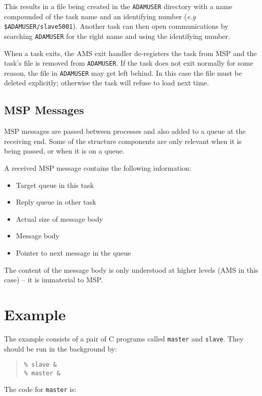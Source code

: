 \documentclass[twoside,11pt]{article}
\renewcommand{\_}{\texttt{\symbol{95}}}
\begin{document}
This results in a file being created in the \texttt{ADAM\_USER} directory
with a name compounded of the task name and an identifying number
(\textit{e.g} \texttt{\$ADAM\_USER/slave\_5001}).
Another task can then open communications by searching \texttt{ADAM\_USER} for
the right name and using the identifying number.

When a task exits, the AMS exit handler de-registers the task from MSP and
the task's file is removed from \texttt{ADAM\_USER}.
If the task does not exit normally for some reason, the file in
\texttt{ADAM\_USER} may get left behind.
In this case the file must be deleted explicitly; otherwise the
task will refuse to load next time.

\subsection{MSP Messages}
MSP messages are passed between processes and also added to a queue at the
receiving end. Some of the structure components are only relevant when it is
being passed, or when it is on a queue.

A received MSP message contains the following information:
\begin{itemize}
\item Target queue in this task
\item Reply queue in other task
\item Actual size of message body
\item Message body
\item Pointer to next message in the queue
\end{itemize}
The content of the message body is only understood at higher levels (AMS in
this case) -- it is immaterial to MSP.

\newpage
\appendix
\section{\label{example}Example}
The example consists of a pair of C programs called \texttt{master} and
\texttt{slave}.
They should be run in the background by:
\begin{quote}
\begin{verbatim}
% slave &
% master &
\end{verbatim}
\end{quote}

The code for \texttt{master} is:
\end{document}
